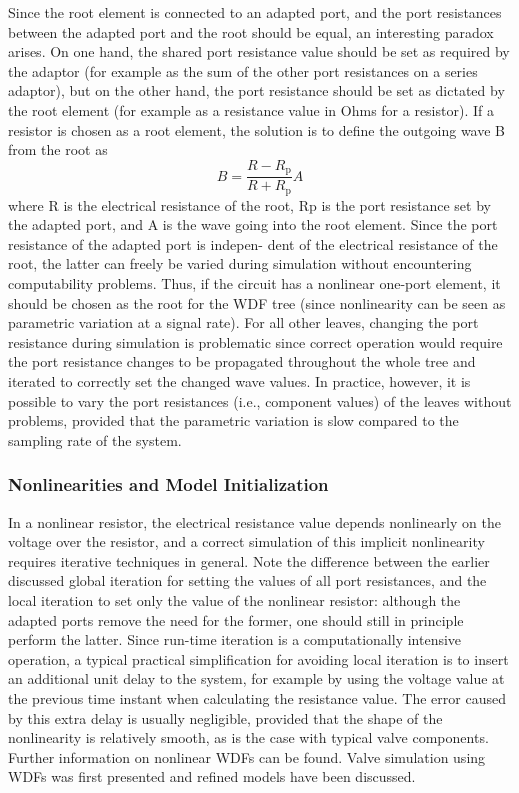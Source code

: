 \documentclass[10pt,a4paper,oneside]{article}
\begin{document}
Since the root element is connected to an adapted port, and the port resistances between the adapted port and the root should be equal, an interesting paradox arises. On one hand, the shared port resistance value should be set as required by the adaptor (for example as the sum of the other port resistances on a series adaptor), but on the other hand, the port resistance should be set as dictated by the root element (for example as a resistance value in Ohms for a resistor). If a resistor is chosen as a root element, the solution is to define the outgoing wave B from the root as
\[
B=\frac{R-R_{\mathrm{p}}}{R+R_{\mathrm{p}}} A
\]
where R is the electrical resistance of the root, Rp is the port resistance set by the adapted port, and A is the wave going into the root element. Since the port resistance of the adapted port is indepen- dent of the electrical resistance of the root, the latter can freely be varied during simulation without encountering computability problems. Thus, if the circuit has a nonlinear one-port element, it should be chosen as the root for the WDF tree (since nonlinearity can be seen as parametric variation at a signal rate). For all other leaves, changing the port resistance during simulation is problematic since correct operation would require the port resistance changes to be propagated throughout the whole tree and iterated to correctly set the changed wave values. In practice, however, it is possible to vary the port resistances (i.e., component values) of the leaves without problems, provided that the parametric variation is slow compared to the sampling rate of the system.
\subsubsection{Nonlinearities and Model Initialization}
In a nonlinear resistor, the electrical resistance value depends nonlinearly on the voltage over the resistor, and a correct simulation of this implicit nonlinearity requires iterative techniques in general. Note the difference between the earlier discussed global iteration for setting the values of all port resistances, and the local iteration to set only the value of the nonlinear resistor: although the adapted ports remove the need for the former, one should still in principle perform the latter. Since run-time iteration is a computationally intensive operation, a typical practical simplification for avoiding local iteration is to insert an additional unit delay to the system, for example by using the voltage value at the previous time instant when calculating the resistance value. The error caused by this extra delay is usually negligible, provided that the shape of the nonlinearity is relatively smooth, as is the case with typical valve components. Further information on nonlinear WDFs can be found. Valve simulation using WDFs was first presented and refined models have been discussed.
\end{document}
